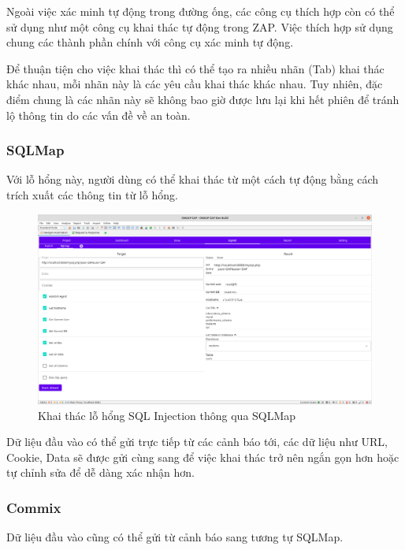 \documentclass[./../main.tex]{subfiles}
\begin{document}
Ngoài việc xác minh tự động trong đường ống, các công cụ thích hợp còn có thể sử dụng như một công cụ khai thác tự động trong ZAP. Việc thích hợp sử dụng chung các thành phần chính với công cụ xác minh tự động.

Để thuận tiện cho việc khai thác thì có thể tạo ra nhiều nhãn (Tab) khai thác khác nhau, mỗi nhãn này là các yêu cầu khai thác khác nhau. Tuy nhiên, đặc điểm chung là các nhãn này sẽ không bao giờ được lưu lại khi hết phiên để tránh lộ thông tin do các vấn đề về an toàn.
\subsubsection{SQLMap}
Với lỗ hổng này, người dùng có thể khai thác từ một cách tự động bằng cách trích xuất các thông tin từ lỗ hổng.

\begin{figure}[H]
	\includegraphics[width=\linewidth]{./images/sqlmap_explot.png}
	\caption{Khai thác lỗ hổng SQL Injection thông qua SQLMap}
	\label{fig:sqlmap_explot}
\end{figure}
Dữ liệu đầu vào có thể gửi trực tiếp từ các cảnh báo tới, các dữ liệu như URL, Cookie, Data sẽ được gửi cùng sang để việc khai thác trở nên ngắn gọn hơn hoặc tự chỉnh sửa để dễ dàng xác nhận hơn.
\subsubsection{Commix}

Dữ liệu đầu vào cũng có thể gửi từ cảnh báo sang tương tự SQLMap.
\end{document}
